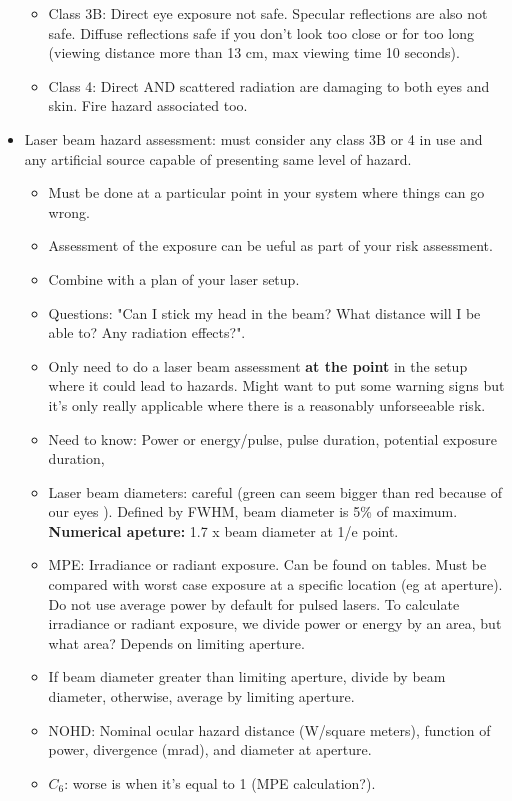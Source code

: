 \documentclass[a4paper,11pt]{article}
\begin{document}
\begin{itemize}
\begin{itemize}
	\item Class 3B: Direct eye exposure not safe. Specular reflections are also not safe. Diffuse reflections safe if you don't look too close or for too long (viewing distance more than 13 cm, max viewing time 10 seconds).
	\item Class 4: Direct AND scattered radiation are damaging to both eyes and skin. Fire hazard associated too.
\end{itemize}
\item Laser beam hazard assessment: must consider any class 3B or 4 in use and any artificial source capable of presenting same level of hazard.
\begin{itemize}
	\item Must be done at a particular point in your system where things can go wrong.
	\item Assessment of the exposure can be ueful as part of your risk assessment.
	\item Combine with a plan of your laser setup.
	\item Questions: "Can I stick my head in the beam? What distance will I be able to? Any radiation effects?".
	\item Only need to do a laser beam assessment \textbf{at the point} in the setup where it could lead to hazards. Might want to put some warning signs but it's only really applicable where there is a reasonably unforseeable risk.
	\item Need to know: Power or energy/pulse, pulse duration, potential exposure duration, 
	\item Laser beam diameters: careful (green can seem bigger than red because of our eyes ). Defined by FWHM, beam diameter is 5\% of maximum. \\
	\textbf{Numerical apeture:} 1.7 x beam diameter at 1/e point.
	\item MPE: Irradiance or radiant exposure. Can be found on tables. Must be compared with worst case exposure at a specific location (eg at aperture). Do not use average power by default for pulsed lasers. To calculate irradiance or radiant exposure, we divide power or energy by an area, but what area? Depends on limiting aperture.
	\item If beam diameter greater than limiting aperture, divide by beam diameter, otherwise, average by limiting aperture.
	\item NOHD: Nominal ocular hazard distance (W/square meters), function of power, divergence (mrad), and diameter at aperture.	
	\item $C_6$: worse is when it's equal to 1 (MPE calculation?).

\end{itemize}
\end{itemize}
\end{document}

